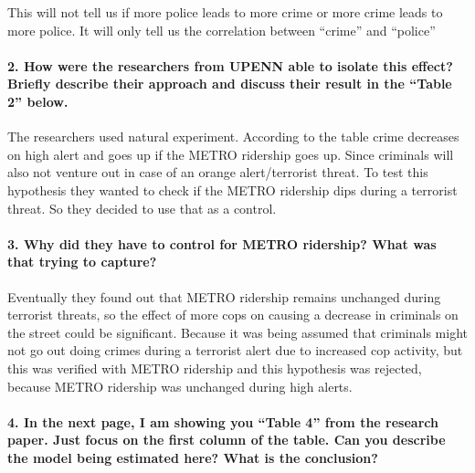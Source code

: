 \documentclass[
]{article}
\begin{document}
This will not tell us if more police leads to more crime or more crime
leads to more police. It will only tell us the correlation between
``crime'' and ``police''

\hypertarget{how-were-the-researchers-from-upenn-able-to-isolate-this-effect-briefly-describe-their-approach-and-discuss-their-result-in-the-table-2-below.}{%
\paragraph{2. How were the researchers from UPENN able to isolate this
effect? Briefly describe their approach and discuss their result in the
``Table 2''
below.}\label{how-were-the-researchers-from-upenn-able-to-isolate-this-effect-briefly-describe-their-approach-and-discuss-their-result-in-the-table-2-below.}}

The researchers used natural experiment. According to the table crime
decreases on high alert and goes up if the METRO ridership goes up.
Since criminals will also not venture out in case of an orange
alert/terrorist threat. To test this hypothesis they wanted to check if
the METRO ridership dips during a terrorist threat. So they decided to
use that as a control.

\hypertarget{why-did-they-have-to-control-for-metro-ridership-what-was-that-trying-to-capture}{%
\paragraph{3. Why did they have to control for METRO ridership? What was
that trying to
capture?}\label{why-did-they-have-to-control-for-metro-ridership-what-was-that-trying-to-capture}}

Eventually they found out that METRO ridership remains unchanged during
terrorist threats, so the effect of more cops on causing a decrease in
criminals on the street could be significant. Because it was being
assumed that criminals might not go out doing crimes during a terrorist
alert due to increased cop activity, but this was verified with METRO
ridership and this hypothesis was rejected, because METRO ridership was
unchanged during high alerts.

\hypertarget{in-the-next-page-i-am-showing-you-table-4-from-the-research-paper.-just-focus-on-the-first-column-of-the-table.-can-you-describe-the-model-being-estimated-here-what-is-the-conclusion}{%
\paragraph{4. In the next page, I am showing you ``Table 4'' from the
research paper. Just focus on the first column of the table. Can you
describe the model being estimated here? What is the
conclusion?}\label{in-the-next-page-i-am-showing-you-table-4-from-the-research-paper.-just-focus-on-the-first-column-of-the-table.-can-you-describe-the-model-being-estimated-here-what-is-the-conclusion}}
\end{document}
